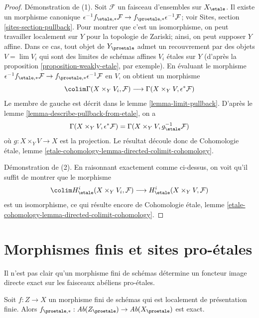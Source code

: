\begin{proof}
Démonstration de (1). Soit $\mathcal{F}$ un faisceau d'ensembles sur $X_\etale$. Il existe
un morphisme canonique $\epsilon^{-1}f_{\etale, *}\mathcal{F} \to
f_{\proetale, *}\epsilon^{-1}\mathcal{F}$; voir
Sites, section \ref{sites-section-pullback}.
Pour montrer que c'est un isomorphisme, on peut travailler localement sur $Y$ pour la topologie de Zariski; ainsi,
on peut supposer $Y$ affine. Dans ce cas,
tout objet de $Y_\proetale$ admet un recouvrement par des objets $V = \lim V_i$
qui sont des limites de schémas affines $V_i$ \'etales sur $Y$ (d'après la
proposition \ref{proposition-weakly-etale},
par exemple). En évaluant le morphisme
$\epsilon^{-1}f_{\etale, *}\mathcal{F} \to
f_{\proetale, *}\epsilon^{-1}\mathcal{F}$
en $V$, on obtient un morphisme
$$
\colim \Gamma(X \times_Y V_i, \mathcal{F})
\longrightarrow
\Gamma(X \times_Y V, \epsilon^*\mathcal{F})
$$
Le membre de gauche est décrit dans le lemme \ref{lemma-limit-pullback}.
D'après le lemme \ref{lemma-describe-pullback-from-etale}, on a
$$
\Gamma(X \times_Y V, \epsilon^*\mathcal{F}) =
\Gamma(X \times_Y V, g_\etale^{-1}\mathcal{F})
$$
où $g : X \times_Y V \to X$ est la projection. Le résultat découle donc de
Cohomologie \'etale, lemme
\ref{etale-cohomology-lemma-directed-colimit-cohomology}.

\medskip\noindent
Démonstration de (2). En raisonnant exactement comme ci-dessus,
on voit qu'il suffit de montrer que le morphisme
$$
\colim H^i_\etale(X \times_Y V_i, \mathcal{F})
\longrightarrow
H^i_\etale(X \times_Y V, \mathcal{F})
$$
est un isomorphisme, ce qui résulte encore de Cohomologie \'etale, lemme
\ref{etale-cohomology-lemma-directed-colimit-cohomology}.
\end{proof}







\section{Morphismes finis et sites pro-\'etales}
\label{section-finite}

\noindent
Il n'est pas clair qu'un morphisme fini de schémas détermine
un foncteur image directe exact sur les faisceaux abéliens pro-\'etales.

\begin{lemma}
\label{lemma-finite}
Soit $f : Z \to X$ un morphisme fini de schémas qui est
localement de présentation finie. Alors
$f_{\proetale, *} : \textit{Ab}(Z_\proetale) \to \textit{Ab}(X_\proetale)$
est exact.
\end{lemma}

